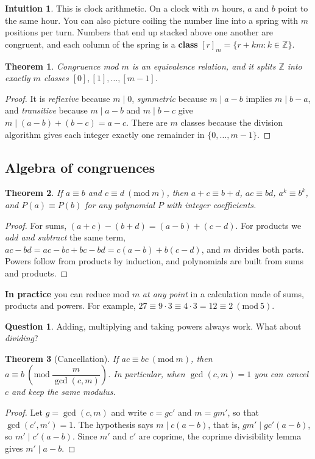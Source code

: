 \documentclass[11pt,a4paper]{article}
\newtheorem{theorem}{Theorem}[section]
\theoremstyle{definition}
\newcommand{\Z}{\mathbb{Z}}
\newcommand{\md}[1]{\ (\mathrm{mod}\ #1)}
\theoremstyle{noteit}
\newtheorem*{question}{Question}
\theoremstyle{note}
\newtheorem*{intuition}{Intuition}
\begin{document}
\begin{intuition}
This is clock arithmetic. On a clock with $m$ hours, $a$ and $b$ point to the same hour. You can also picture coiling the number line into a spring with $m$ positions per turn. Numbers that end up stacked above one another are congruent, and each column of the spring is a \textbf{class} $[r]_m=\{r+km : k\in\Z\}$.
\end{intuition}

\begin{theorem}
Congruence mod $m$ is an equivalence relation, and it splits $\Z$ into exactly $m$ classes $[0],[1],\dots,[m-1]$.
\end{theorem}
\begin{proof}
It is \emph{reflexive} because $m\mid 0$, \emph{symmetric} because $m\mid a-b$ implies $m\mid b-a$, and \emph{transitive} because $m\mid a-b$ and $m\mid b-c$ give $m\mid(a-b)+(b-c)=a-c$. There are $m$ classes because the division algorithm gives each integer exactly one remainder in $\{0,\dots,m-1\}$.
\end{proof}

\subsection{Algebra of congruences}

\begin{theorem}
If $a\equiv b$ and $c\equiv d\md m$, then $a+c\equiv b+d$, $ac\equiv bd$, $a^k\equiv b^k$, and $P(a)\equiv P(b)$ for any polynomial $P$ with integer coefficients.
\end{theorem}
\begin{proof}
For sums, $(a+c)-(b+d)=(a-b)+(c-d)$. For products we \emph{add and subtract} the same term, $ac-bd=ac-bc+bc-bd=c(a-b)+b(c-d)$, and $m$ divides both parts. Powers follow from products by induction, and polynomials are built from sums and products.
\end{proof}

\textbf{In practice} you can reduce mod $m$ \emph{at any point} in a calculation made of sums, products and powers. For example, $27\equiv 9\cdot3\equiv 4\cdot 3=12\equiv 2\md 5$.

\begin{question}
Adding, multiplying and taking powers always work. What about \emph{dividing}?
\end{question}

\begin{theorem}[Cancellation]
If $ac\equiv bc\md m$, then $a\equiv b\md{\dfrac{m}{\gcd(c,m)}}$. In particular, when $\gcd(c,m)=1$ you can cancel $c$ and keep the same modulus.
\end{theorem}
\begin{proof}
Let $g=\gcd(c,m)$ and write $c=gc'$ and $m=gm'$, so that $\gcd(c',m')=1$. The hypothesis says $m\mid c(a-b)$, that is, $gm'\mid gc'(a-b)$, so $m'\mid c'(a-b)$. Since $m'$ and $c'$ are coprime, the coprime divisibility lemma gives $m'\mid a-b$.
\end{proof}
\end{document}
